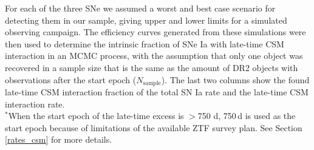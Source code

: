 \documentclass[a4paper,oneside,12pt, class=Latex/Classes/PhDthesisPSnPDF, crop=false]{standalone}
\begin{document}
\begin{table}
 \centering
 \caption{Parameters used for rate estimation simulations for each object.}
\begin{flushleft}
For each of the three SNe we assumed a worst and best case scenario for detecting them in our sample, giving upper and lower limits for a simulated observing campaign. The efficiency curves generated from these simulations were then used to determine the intrinsic fraction of SNe Ia with late-time CSM interaction in an MCMC process, with the assumption that only one object was recovered in a sample size that is the same as the amount of DR2 objects with observations after the start epoch ($N_\text{sample}$). The last two columns show the found late-time CSM interaction fraction of the total SN Ia rate and the late-time CSM interaction rate.\\
$^*$When the start epoch of the late-time excess is $>$750 d, 750\,d is used as the start epoch because of limitations of the available ZTF survey plan. See Section \ref{rates_csm} for more details.\\
\end{flushleft} 
 \label{rate_sims}
\end{table}
\end{document}

